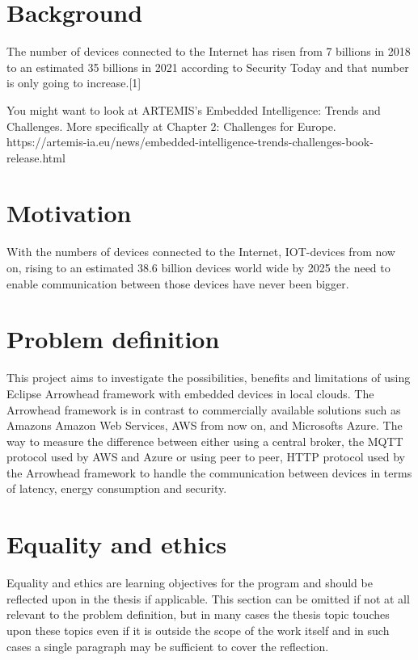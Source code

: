 
\section{Background}
The number of devices connected to the Internet has risen from 7 billions in 2018 to an estimated 35 billions in 2021 according to Security Today and that number is only going to increase.[1] %

You might want to look at ARTEMIS's Embedded Intelligence: Trends and Challenges.
More specifically at Chapter 2: Challenges for Europe.
https://artemis-ia.eu/news/embedded-intelligence-trends-challenges-book-release.html

\section{Motivation}
With the numbers of devices connected to the Internet, IOT-devices from now on, rising to an estimated 38.6 billion devices world wide by 2025 the need to enable communication between those devices have never been bigger.

\section{Problem definition}
This project aims to investigate the possibilities, benefits and limitations of using Eclipse Arrowhead framework with embedded devices in local clouds.
The Arrowhead framework is in contrast to commercially available solutions such as Amazons Amazon Web Services, AWS from now on, and Microsofts Azure.  
The way to measure the difference between either using a central broker, the MQTT protocol used by AWS and Azure or using peer to peer, HTTP protocol used by the Arrowhead framework to handle the communication between devices in terms of latency, energy consumption and security. %

\section{Equality and ethics}
Equality and ethics are learning objectives for the program and should be reflected upon in the thesis if applicable. This section can be omitted if not at all relevant to the problem definition, but in many cases the thesis topic touches upon these topics even if it is outside the scope of the work itself and in such cases a single paragraph may be sufficient to cover the reflection.

